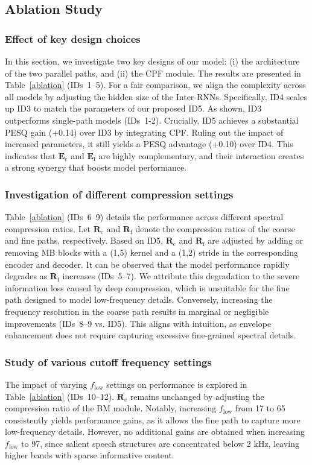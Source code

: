 \documentclass[journal]{IEEEtran}
\begin{document}
\subsection{Ablation Study}
\subsubsection{Effect of key design choices}
In this section, we investigate two key designs of our model: (i) the architecture of the two parallel paths, and (ii) the CPF module.
The results are presented in Table~\ref{ablation} (IDs~1--5).
For a fair comparison, we align the complexity across all models by adjusting the hidden size of the Inter-RNNs.
Specifically, ID4 scales up ID3 to match the parameters of our proposed ID5.
As shown, ID3 outperforms single-path models (IDs~1-2).
Crucially, ID5 achieves a substantial PESQ gain (+0.14) over ID3 by integrating CPF.
Ruling out the impact of increased parameters, it still yields a PESQ advantage (+0.10) over ID4.
This indicates that $\mathbf{E}_{\text{c}}$ and $\mathbf{E}_{\text{f}}$ are highly complementary, and their interaction creates a strong synergy that boosts model performance.

\subsubsection{Investigation of different compression settings}
Table~\ref{ablation} (IDs~6--9) details the performance across different spectral compression ratios.
Let $\mathbf{R}_{\text{c}}$ and $\mathbf{R}_{\text{f}}$ denote the compression ratios of the coarse and fine paths, respectively.
Based on ID5, $\mathbf{R}_{\text{c}}$ and $\mathbf{R}_{\text{f}}$ are adjusted by adding or removing MB blocks with a (1,5) kernel and a (1,2) stride in the corresponding encoder and decoder.
It can be observed that the model performance rapidly degrades as $\mathbf{R}_{\text{f}}$ increases (IDs~5--7).
We attribute this degradation to the severe information loss caused by deep compression, which is unsuitable for the fine path designed to model low-frequency details.
Conversely, increasing the frequency resolution in the coarse path results in marginal or negligible improvements (IDs~8--9 vs. ID5).
This aligns with intuition, as envelope enhancement does not require capturing excessive fine-grained spectral details.
\subsubsection{Study of various cutoff frequency settings}
The impact of varying $f_{\text{low}}$ settings on performance is explored in Table~\ref{ablation} (IDs~10--12).
$\mathbf{R}_{\text{c}}$ remains unchanged by adjusting the compression ratio of the BM module.
Notably, increasing $f_{\text{low}}$ from 17 to 65 consistently yields performance gains, as it allows the fine path to capture more low-frequency details.
However, no additional gains are obtained when increasing $f_{\text{low}}$ to 97, since salient speech structures are concentrated below 2 kHz, leaving higher bands with sparse informative content.
\end{document}

